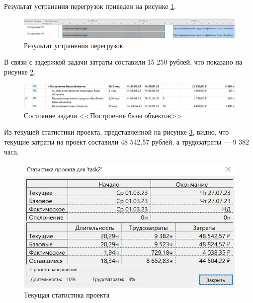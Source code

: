 Результат устранения перегрузок приведен на рисунке \ref{img:task2-no-overloads}.

\begin{figure}[H]
	\begin{center}
		\includegraphics[scale=0.3]{inc/img/task2-no-overloads.jpg}
	\end{center}
	\captionsetup{justification=centering}
	\caption{Результат устранения перегрузок}
	\label{img:task2-no-overloads}
\end{figure}

В связи с задержкой задачи затраты составили 15 250 рублей, что показано на рисунке \ref{img:task2-final}.

\begin{figure}[H]
	\begin{center}
		\includegraphics[scale=0.3]{inc/img/task2-final.jpg}
	\end{center}
	\captionsetup{justification=centering}
	\caption{Состояние задачи <<Построение базы объектов>>}
	\label{img:task2-final}
\end{figure}

Из текущей статистики проекта, представленной на рисунке \ref{img:task2-stat}, видно, что текущие затраты на проект составили 48 542.57 рублей, а трудозатраты --- 9 382 часа.

\begin{figure}[H]
	\begin{center}
		\includegraphics[scale=0.3]{inc/img/task2-stat.jpg}
	\end{center}
	\captionsetup{justification=centering}
	\caption{Текущая статистика проекта}
	\label{img:task2-stat}
\end{figure}
 
